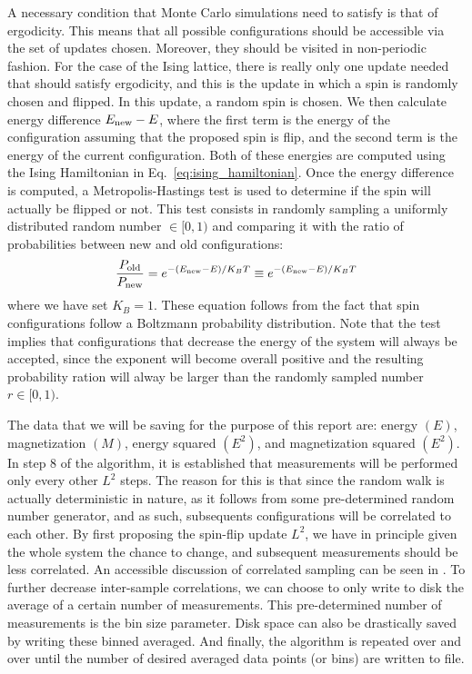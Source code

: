 \documentclass[12pt]{article}
\begin{document}
A necessary condition that Monte Carlo simulations need to satisfy is that of ergodicity. This means that all possible configurations should be accessible via the set of updates chosen. Moreover, they should be visited in non-periodic fashion. For the case of the Ising lattice, there is really only one update needed that should satisfy ergodicity, and this is the update in which a spin is randomly chosen and flipped. In this update, a random spin is chosen. We then calculate energy difference $E_{\rm{new}}-E$, where the first term is the energy of the configuration assuming that the proposed spin is flip, and the second term is the energy of the current configuration. Both of these energies are computed using the Ising Hamiltonian in Eq.~\eqref{eq:ising_hamiltonian}. Once the energy difference is computed, a Metropolis-Hastings test \cite{doi:10.1063/1.1699114} is used to determine if the spin will actually be flipped or not. This test consists in randomly sampling a uniformly distributed random number $\in [0,1)$ and comparing it with the ratio of probabilities between new and old configurations:
%
\begin{equation}
\frac{P_{\rm{old}}}{P_{\rm{new}}} = e^{-(E_{\rm{new}}-E)/K_BT} \equiv e^{-(E_{\rm{new}}-E)/K_BT}
\end{equation}
%
where we have set $K_B=1$. These equation follows from the fact that spin configurations follow a Boltzmann probability distribution. Note that the test implies that configurations that decrease the energy of the system will always be accepted, since the exponent will become overall positive and the resulting probability ration will alway be larger than the randomly sampled number $r \in [0,1)$.

The data that we will be saving for the purpose of this report are: energy $(E)$, magnetization $(M)$, energy squared $(E^2)$, and magnetization squared $(E^2)$. In step 8 of the algorithm, it is established that measurements will be performed only every other $L^2$ steps. The reason for this is that since the random walk is actually deterministic in nature, as it follows from some pre-determined random number generator, and as such, subsequents configurations will be correlated to each other. By first proposing the spin-flip update $L^2$, we have in principle given the whole system the chance to change, and subsequent measurements should be less correlated. An accessible discussion of correlated sampling can be seen in \cite{2010}. To further decrease inter-sample correlations, we can choose to only write to disk the average of a certain number of measurements. This pre-determined number of measurements is the bin size parameter. Disk space can also be drastically saved by writing these binned averaged. And finally, the algorithm is repeated over and over until the number of desired averaged data points (or bins) are written to file.
\end{document}
